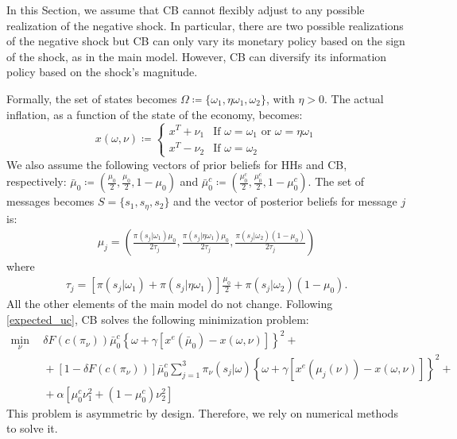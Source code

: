 \documentclass[12pt,a4paper]{article}
\begin{document}
In this Section, we assume that CB cannot flexibly adjust to any possible realization of the negative shock. In particular, there are two possible realizations of the negative shock but CB can only vary its monetary policy based on the sign of the shock, as in the main model. However, CB can diversify its information policy based on the shock's magnitude.

Formally, the set of states becomes $\Omega \coloneqq \{\omega_1, \eta\omega_1,\omega_2\}$, with $\eta>0$.
The actual inflation, as a function of the state of the economy, becomes: 
\begin{equation}
    x(\omega,\nu)\coloneqq\left\{
    \begin{array}{cc}
      x^T+\nu_1&  \mbox{If } \omega=\omega_1 \mbox{ or } \omega=\eta\omega_1\\
      x^T-\nu_2   &  \mbox{If } \omega=\omega_2
    \end{array}
    \right.
\end{equation}
We also assume the following vectors of prior beliefs for HHs and CB, respectively: $\bar{\mu}_0\coloneqq\left(\frac{\mu_0}{2},\frac{\mu_0}{2},1-\mu_0\right)$ and $\bar{\mu}_0^c\coloneqq\left(\frac{\mu_0^c}{2},\frac{\mu_0^c}{2},1-\mu_0^c\right)$. The set of messages becomes $S=\{s_1,s_\eta,s_2\}$ and the vector of posterior beliefs for message $j$ is:
\begin{align}
    \mu_j = \left(\frac{\pi(s_j|\omega_1)\mu_0}{2\tau_j}, \frac{\pi(s_j|\eta\omega_1)\mu_0}{2\tau_j}, \frac{\pi(s_j|\omega_2)(1-\mu_0)}{2\tau_j}\right)
\end{align}
where
\begin{align}
    \tau_j = [\pi(s_j|\omega_1)+\pi(s_j|\eta\omega_1)]\frac{\mu_0}{2} + \pi(s_j|\omega_2)(1-\mu_0).
\end{align}
All the other elements of the main model do not change. Following \eqref{expected_uc}, CB solves the following minimization problem:
\begin{equation}
    \begin{split}
    \min_{\nu} \ & \ \delta F(c(\pi_\nu))\bar{\mu}_0^c\left\{\omega+\gamma\left[x^e(\bar{\mu}_0)-x(\omega,\nu)\right]\right\}^2+\\
    \ & \ +[1-\delta F(c(\pi_\nu))]\bar{\mu}_0^c\sum_{j=1}^{3}\pi_\nu(s_j|\omega)\left\{\omega+\gamma\left[x^e(\mu_j(\nu))-x(\omega,\nu)\right]\right\}^2+\\
    \ & \ +\alpha [\mu_0^c\nu_1^2+(1-\mu_0^c)\nu_2^2]
    \end{split}
\end{equation}
This problem is asymmetric by design. Therefore, we rely on numerical methods to solve it.
\end{document}
